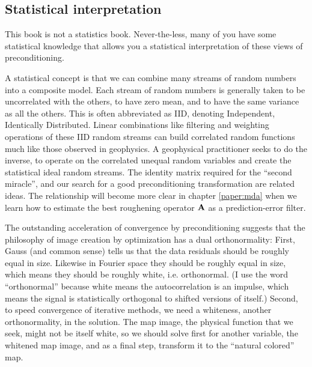 \subsection{Statistical interpretation}
This book is not a statistics book.
Never-the-less, many of you have some statistical knowledge
that allows you a statistical interpretation
of these views of preconditioning.
\par
A statistical concept is that we can combine many streams
of random numbers into a composite model.
Each stream of random numbers is generally taken
to be uncorrelated with the others,
to have zero mean, and to have the same variance
as all the others.
This is often abbreviated as IID, denoting
Independent, Identically Distributed.
Linear combinations
like filtering and weighting operations
of these IID random streams
can build correlated random functions much like those
observed in geophysics.
A geophysical practitioner seeks to do the inverse,
to operate on the correlated unequal random variables
and create the statistical ideal random streams.
The identity matrix required for the ``second miracle'',
and our search for a good preconditioning transformation
are related ideas.
The relationship will become more clear in chapter \ref{paper:mda}
when we learn how to estimate the best roughening operator $\bold A$
as a prediction-error filter.

\par
{}


\par
{}


\par
The outstanding acceleration of convergence by preconditioning
suggests that the philosophy of image creation by optimization
has a dual orthonormality:
First, Gauss (and common sense) tells us that the data residuals
should be roughly equal in size.  Likewise in Fourier space
they should be roughly equal in size, which means they should
be roughly white, i.e. orthonormal.
(I use the word ``orthonormal''
because white means the autocorrelation is an impulse,
which means the signal is statistically orthogonal
to shifted versions of itself.)
Second,
to speed convergence of iterative methods,
we need a whiteness, another orthonormality, in the solution.
The map image, the physical function that we seek, might
not be itself white, so we should solve first for another variable,
the whitened map image, and as a final step,
transform it to the ``natural colored'' map.


